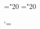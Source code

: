 
 



\mathchardef\Section="20\S@HX
\mathchardef\Paragraph="20\P@HX

\def\@fnsymbol#1{\ifcase#1\or *\or \dagger\or \ddagger\or
  \Section\or \Paragraph\or \|\or **\or \dagger\dagger
   \or \ddagger\ddagger \else\@ctrerr\fi\relax}
 





\def\MTEXMOD#1#2#3{%
 \dimen@#1\relax\PSZ@
 \FONT@{mtex}\nextiii@\textfont\thr@@\next@
 \setbox\z@\hbox{\next@ B}\p@renwd\wd\z@
 \ifx\amstexloaded@\relax
  \buffer@\fontdimen13 \next@
  \buffer\buffer@
 \fi
 \FONT@{mtex}\nextiii@\scriptfont\thr@@\next@
 \FONT@{mtex}\nextiii@\scriptscriptfont\thr@@\next@\relax}





\catcode`\@=\atcode		%

